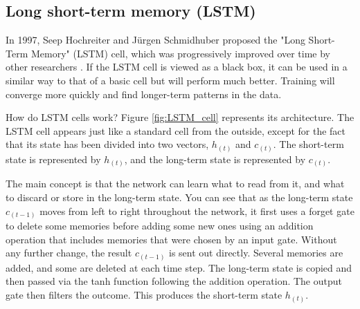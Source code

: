 \subsection{Long short-term memory (LSTM)}
In 1997, Seep Hochreiter and Jürgen Schmidhuber proposed the "Long Short-Term Memory" (LSTM) cell, which was progressively improved over time by other researchers \parencite{hochreiter1997long} . If the LSTM cell is viewed as a black box, it can be used in a similar way to that of a basic cell but will perform much better. Training will converge more quickly and find longer-term patterns in the data.

How do LSTM cells work? Figure \ref{fig:LSTM_cell} represents its architecture. The LSTM cell appears just like a standard cell from the outside, except for the fact that its state has been divided into two vectors, $h_{(t)}$ and $c_{(t)}$. The short-term state is represented by $h_{(t)}$, and the long-term state is represented by $c_{(t)}$.

The main concept is that the network can learn what to read from it, and what to discard or store in the long-term state. You can see that as the long-term state $c_{(t-1)}$ moves from left to right throughout the network, it first uses a forget gate to delete some memories before adding some new ones using an addition operation that includes memories that were chosen by an input gate. Without any further change, the result $c_{(t-1)}$ is sent out directly. Several memories are added, and some are deleted at each time step. The long-term state is copied and then passed via the tanh function following the addition operation. The output gate then filters the outcome. This produces the short-term state $h_{(t)}$.



